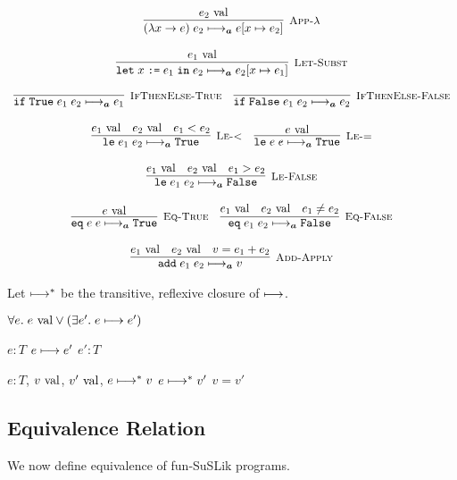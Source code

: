 \documentclass[10pt]{article}
\begin{document}
\[
  \begin{array}{cc}
    \labinfer[App-$\lambda$]{(\lambda x \ra e)\; e_2 \reducesA e[x\mapsto e_2]}{e_2 \val}
    \\\\
    \labinfer[Let-Subst]{\letbnd\; x\; \ttt{:=}\; e_1\; \inexpr\; e_2 \reducesA e_2[x\mapsto e_1]}{e_1 \val}
    \\\\
    \labinfer[IfThenElse-True]{\ite\; \True\; e_1\; e_2 \reducesA e_1}{}
    ~~~
    \labinfer[IfThenElse-False]{\ite\; \False\; e_1\; e_2 \reducesA e_2}{}
    \\\\
    \labinfer[Le-<]{\lesseq\; e_1\; e_2 \reducesA \True}{e_1 \val & e_2 \val & e_1 < e_2}
    ~~~
    \labinfer[Le-=]{\lesseq\; e\; e \reducesA \True}{e \val}
    \\\\
    \labinfer[Le-False]{\lesseq\; e_1\; e_2 \reducesA \False}{e_1 \val & e_2 \val & e_1 > e_2}
    \\\\
    \labinfer[Eq-True]{\eq\; e\; e \reducesA \True}{e \val}
    ~~~
    \labinfer[Eq-False]{\eq\; e_1\; e_2 \reducesA \False}{e_1 \val & e_2 \val & e_1 \neq e_2}
    \\\\
    \labinfer[Add-Apply]{\add\; e_1\; e_2 \reducesA v}{e_1 \val & e_2 \val & v = e_1 + e_2}

  \end{array}
\]

\noindent
Let $\longmapsto^{*}$ be the transitive, reflexive closure of $\longmapsto$.

\begin{theorem}[Progress]
  $\forall e.\; e \textnormal{ val} \lor (\exists e'.\; e \longmapsto e')$
\end{theorem}

\begin{theorem}[Preservation]
   $e : T$  $e \longmapsto e'$  $e' : T$
\end{theorem}

\begin{theorem}
   $e : T$, $v \textnormal{ val}$, $v' \textnormal{ val}$, $e \longmapsto^{*} v$  $e \longmapsto^{*} v'$  $v = v'$
\end{theorem}

\subsection{Equivalence Relation}
\label{sec:FSEquiv}
We now define equivalence of fun-SuSLik programs.
\end{document}
